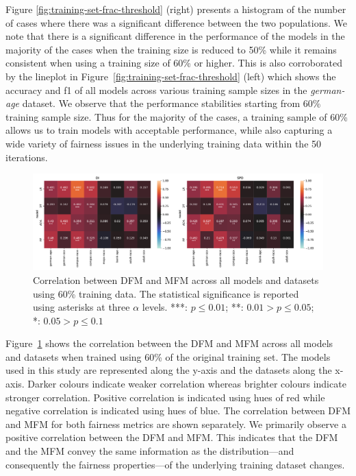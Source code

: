 \documentclass{article}
\begin{document}
Figure \ref{fig:training-set-frac-threshold} (right) presents
a histogram of the number of cases where there was a significant
difference between the two populations. We note that there is
a significant difference in the performance of the models in the
majority of the cases when the training size is reduced to 50\% while
it remains consistent when using a training size of 60\% or
higher. This is also corroborated by the lineplot in
Figure \ref{fig:training-set-frac-threshold} (left) which shows the
accuracy and f1 of all models across various training sample sizes in
the \emph{german-age} dataset. We observe that the performance
stabilities starting from 60\% training sample size. Thus for the
majority of the cases, a training sample of 60\% allows us to train
models with acceptable performance, while also capturing a wide
variety of fairness issues in the underlying training data within the
50 iterations.

\begin{figure}
  \centering
  \includegraphics[width=0.95\linewidth]{heatmap--corr--training-sets-frac.pdf}
  \caption{Correlation between DFM and MFM across all models and
  datasets using 60\% training data. The statistical significance is
  reported using asterisks at three $\alpha$ levels. ***: $p \le
  0.01$; **: $0.01 > p \le 0.05$; *: $0.05 > p \le 0.1$}
  \label{fig:heatmap--corr--training-sets-frac}
\end{figure}

Figure \ref{fig:heatmap--corr--training-sets-frac} shows the
correlation between the DFM and MFM across all models and datasets
when trained using 60\% of the original training set. The models used
in this study are represented along the y-axis and the datasets along
the x-axis. Darker colours indicate weaker correlation whereas
brighter colours indicate stronger correlation. Positive correlation
is indicated using hues of red while negative correlation is indicated
using hues of blue. The correlation between DFM and MFM for both
fairness metrics are shown separately. We primarily observe a positive
correlation between the DFM and MFM. This indicates that the DFM and
the MFM convey the same information as the distribution---and
consequently the fairness properties---of the underlying training
dataset changes.
\end{document}
